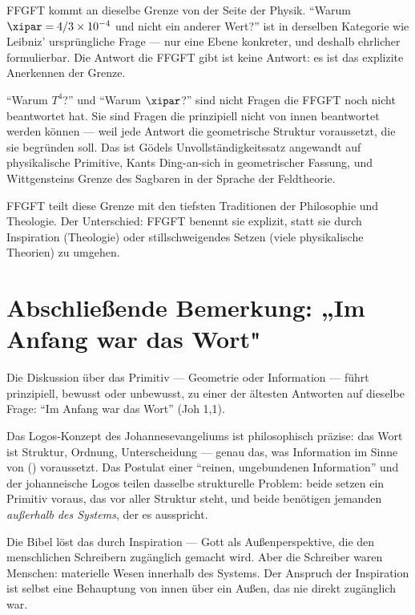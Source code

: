 FFGFT kommt an dieselbe Grenze von der Seite der Physik. ``Warum $\xipar = 4/3 \times 10^{-4}$ und nicht ein anderer Wert?'' ist in derselben Kategorie wie Leibniz' ursprüngliche Frage --- nur eine Ebene konkreter, und deshalb ehrlicher formulierbar. Die Antwort die FFGFT gibt ist keine Antwort: es ist das explizite Anerkennen der Grenze.

\begin{erkenntnis}
``Warum $T^4$?'' und ``Warum $\xipar$?'' sind nicht Fragen die FFGFT noch nicht beantwortet hat. Sie sind Fragen die prinzipiell nicht von innen beantwortet werden können --- weil jede Antwort die geometrische Struktur voraussetzt, die sie begründen soll. Das ist Gödels Unvollständigkeitssatz angewandt auf physikalische Primitive, Kants Ding-an-sich in geometrischer Fassung, und Wittgensteins Grenze des Sagbaren in der Sprache der Feldtheorie.

FFGFT teilt diese Grenze mit den tiefsten Traditionen der Philosophie und Theologie. Der Unterschied: FFGFT benennt sie explizit, statt sie durch Inspiration (Theologie) oder stillschweigendes Setzen (viele physikalische Theorien) zu umgehen.
\end{erkenntnis}

\section*{Abschließende Bemerkung: „Im Anfang war das Wort"}

Die Diskussion über das Primitiv --- Geometrie oder Information --- führt prinzipiell, bewusst oder unbewusst, zu einer der ältesten Antworten auf dieselbe Frage: ``Im Anfang war das Wort'' (Joh 1,1).

Das Logos-Konzept des Johannesevangeliums ist philosophisch präzise: das Wort ist Struktur, Ordnung, Unterscheidung --- genau das, was Information im Sinne von \citeauthor{Shannon1948} (\citeyear{Shannon1948}) voraussetzt. Das Postulat einer ``reinen, ungebundenen Information'' und der johanneische Logos teilen dasselbe strukturelle Problem: beide setzen ein Primitiv voraus, das vor aller Struktur steht, und beide benötigen jemanden \emph{außerhalb des Systems}, der es ausspricht.

Die Bibel löst das durch Inspiration --- Gott als Außenperspektive, die den menschlichen Schreibern zugänglich gemacht wird. Aber die Schreiber waren Menschen: materielle Wesen innerhalb des Systems. Der Anspruch der Inspiration ist selbst eine Behauptung von innen über ein Außen, das nie direkt zugänglich war.

